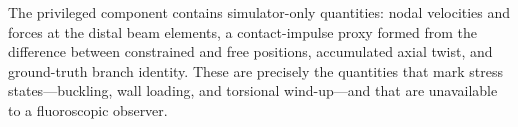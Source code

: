 The privileged component contains simulator-only quantities: nodal velocities and forces at the
distal beam elements, a contact-impulse proxy formed from the difference between constrained
and free positions, accumulated axial twist, and ground-truth branch identity. These are
precisely the quantities that mark stress states---buckling, wall loading, and torsional
wind-up---and that are unavailable to a fluoroscopic observer.

%
%
%
%

